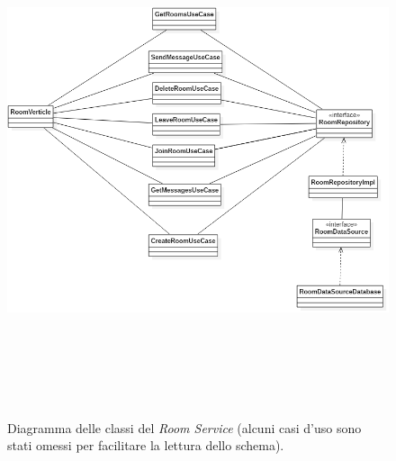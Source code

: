 \begin{figure}
    \centering
  \includegraphics[height=15cm, width=12cm,
		keepaspectratio]{images/RoomServiceClassDiagram.png}
  \caption{Diagramma delle classi del \textit{Room Service} (alcuni casi d’uso sono stati omessi per facilitare la lettura dello schema).}
  \label{fig:room-service-class-diagram}
\end{figure}

